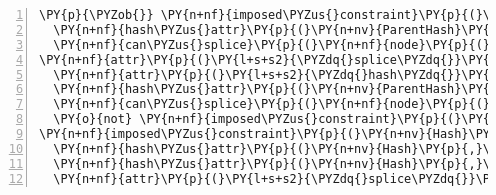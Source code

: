 \begin{Verbatim}[commandchars=\\\{\},numbers=left,xleftmargin=5mm,fontsize=\footnotesize]
\PY{p}{\PYZob{}} \PY{n+nf}{imposed\PYZus{}constraint}\PY{p}{(}\PY{n+nv}{ParentHash}\PY{p}{,}\PY{l+s+s2}{\PYZdq{}hash\PYZdq{}}\PY{p}{,}\PY{n+nv}{DepName}\PY{p}{,}\PY{n+nv}{DepHash}\PY{p}{)} \PY{p}{\PYZcb{}} \PY{p}{:\PYZhy{}} 
  \PY{n+nf}{hash\PYZus{}attr}\PY{p}{(}\PY{n+nv}{ParentHash}\PY{p}{,}\PY{l+s+s2}{\PYZdq{}hash\PYZdq{}}\PY{p}{,}\PY{n+nv}{DepName}\PY{p}{,}\PY{n+nv}{DepHash}\PY{p}{)}\PY{p}{,}
  \PY{n+nf}{can\PYZus{}splice}\PY{p}{(}\PY{n+nf}{node}\PY{p}{(}\PY{n+nv}{SpliceName}\PY{p}{)}\PY{p}{,}\PY{n+nv}{DepName}\PY{p}{,}\PY{n+nv}{DepHash}\PY{p}{)}\PY{p}{.}
\PY{n+nf}{attr}\PY{p}{(}\PY{l+s+s2}{\PYZdq{}splice\PYZdq{}}\PY{p}{,}\PY{n+nv}{ParentNode}\PY{p}{,}\PY{n+nf}{node}\PY{p}{(}\PY{n+nv}{SpliceName}\PY{p}{)}\PY{p}{,}\PY{n+nv}{DepName}\PY{p}{,}\PY{n+nv}{DepHash}\PY{p}{)} \PY{p}{:\PYZhy{}} 
  \PY{n+nf}{attr}\PY{p}{(}\PY{l+s+s2}{\PYZdq{}hash\PYZdq{}}\PY{p}{,}\PY{n+nv}{ParentNode}\PY{p}{,}\PY{n+nv}{ParentHash}\PY{p}{)}\PY{p}{,}
  \PY{n+nf}{hash\PYZus{}attr}\PY{p}{(}\PY{n+nv}{ParentHash}\PY{p}{,}\PY{l+s+s2}{\PYZdq{}hash\PYZdq{}}\PY{p}{,}\PY{n+nv}{DepName}\PY{p}{,}\PY{n+nv}{DepHash}\PY{p}{)}\PY{p}{,}
  \PY{n+nf}{can\PYZus{}splice}\PY{p}{(}\PY{n+nf}{node}\PY{p}{(}\PY{n+nv}{SpliceName}\PY{p}{)}\PY{p}{,}\PY{n+nv}{DepName}\PY{p}{,}\PY{n+nv}{DepHash}\PY{p}{)}\PY{p}{,}
  \PY{o}{not} \PY{n+nf}{imposed\PYZus{}constraint}\PY{p}{(}\PY{n+nv}{ParentHash}\PY{p}{,}\PY{l+s+s2}{\PYZdq{}hash\PYZdq{}}\PY{p}{,}\PY{n+nv}{DepName}\PY{p}{,}\PY{n+nv}{DepHash}\PY{p}{)}\PY{p}{.}
\PY{n+nf}{imposed\PYZus{}constraint}\PY{p}{(}\PY{n+nv}{Hash}\PY{p}{,}\PY{l+s+s2}{\PYZdq{}depends\PYZus{}on\PYZdq{}}\PY{p}{,}\PY{n+nv}{ParentName}\PY{p}{,}\PY{n+nv}{SpliceName}\PY{p}{,}\PY{n+nv}{Type}\PY{p}{)} \PY{p}{:\PYZhy{}} 
  \PY{n+nf}{hash\PYZus{}attr}\PY{p}{(}\PY{n+nv}{Hash}\PY{p}{,}\PY{l+s+s2}{\PYZdq{}depends\PYZus{}on\PYZdq{}}\PY{p}{,}\PY{n+nv}{ParentName}\PY{p}{,}\PY{n+nv}{DepName}\PY{p}{,}\PY{n+nv}{Type}\PY{p}{)}\PY{p}{,}
  \PY{n+nf}{hash\PYZus{}attr}\PY{p}{(}\PY{n+nv}{Hash}\PY{p}{,}\PY{l+s+s2}{\PYZdq{}hash\PYZdq{}}\PY{p}{,}\PY{n+nv}{DepName}\PY{p}{,}\PY{n+nv}{DepHash}\PY{p}{)}\PY{p}{,}
  \PY{n+nf}{attr}\PY{p}{(}\PY{l+s+s2}{\PYZdq{}splice\PYZdq{}}\PY{p}{,}\PY{n+nf}{node}\PY{p}{(}\PY{n+nv}{ParentName}\PY{p}{)}\PY{p}{,}\PY{n+nf}{node}\PY{p}{(}\PY{n+nv}{SpliceName}\PY{p}{)}\PY{p}{,}\PY{n+nv}{DepName}\PY{p}{,}\PY{n+nv}{DepHash}\PY{p}{)}\PY{p}{.}
\end{Verbatim}
